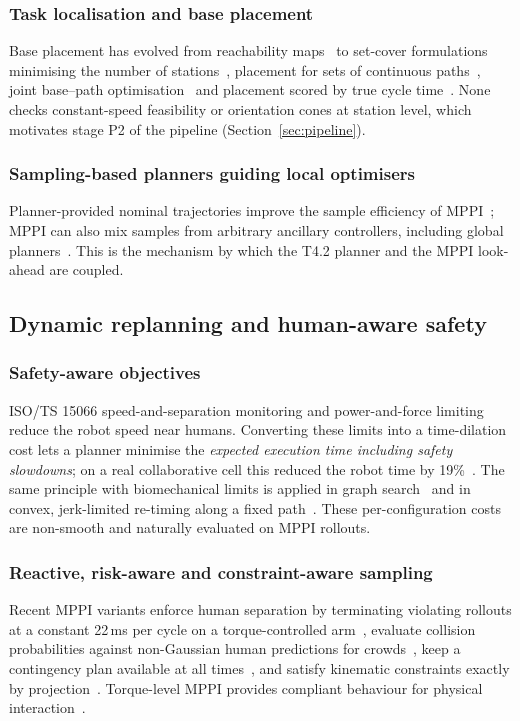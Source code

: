 \documentclass{plan4ari_report}
\begin{document}
\subsubsection{Task localisation and base placement}
Base placement has evolved from reachability maps~\cite{makhal2018reuleaux} to set-cover formulations minimising the number of stations~\cite{nguyen2023taskclustering}, placement for sets of continuous paths~\cite{weingartshofer2021tcpbase}, joint base--path optimisation~\cite{zhao2025bstar} and placement scored by true cycle time~\cite{wachter2024tcpbase}. None checks constant-speed feasibility or orientation cones at station level, which motivates stage P2 of the pipeline (Section~\ref{sec:pipeline}).

\subsubsection{Sampling-based planners guiding local optimisers}
Planner-provided nominal trajectories improve the sample efficiency of MPPI~\cite{tao2023rrtmppi}; MPPI can also mix samples from arbitrary ancillary controllers, including global planners~\cite{trevisan2024biasedmppi}. This is the mechanism by which the T4.2 planner and the MPPI look-ahead are coupled.

\subsection{Dynamic replanning and human-aware safety}\label{sec:safety}

\subsubsection{Safety-aware objectives}
ISO/TS 15066 speed-and-separation monitoring and power-and-force limiting reduce the robot speed near humans. Converting these limits into a time-dilation cost lets a planner minimise the \emph{expected execution time including safety slowdowns}; on a real collaborative cell this reduced the robot time by 19\%~\cite{faroni2022safetyaware}. The same principle with biomechanical limits is applied in graph search~\cite{laha2023sstar} and in convex, jerk-limited re-timing along a fixed path~\cite{palleschi2021fastsafe}. These per-configuration costs are non-smooth and naturally evaluated on MPPI rollouts.

\subsubsection{Reactive, risk-aware and constraint-aware sampling}
Recent MPPI variants enforce human separation by terminating violating rollouts at a constant 22\,ms per cycle on a torque-controlled arm~\cite{gursoy2026cosmik}, evaluate collision probabilities against non-Gaussian human predictions for crowds~\cite{trevisan2025drampi}, keep a contingency plan available at all times~\cite{jung2024contingency}, and satisfy kinematic constraints exactly by projection~\cite{lee2026prmppi}. Torque-level MPPI provides compliant behaviour for physical interaction~\cite{im2026torquemppi}.
\end{document}
